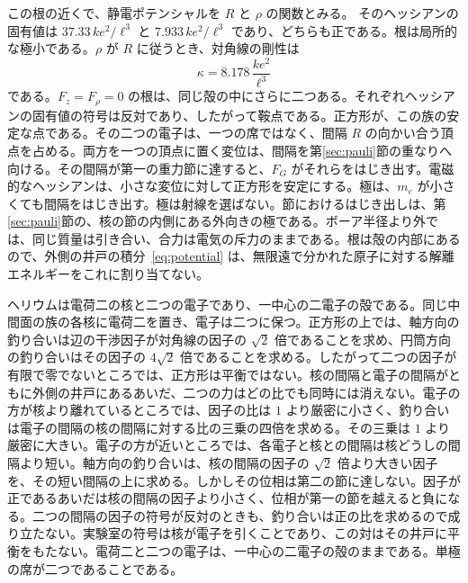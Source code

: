 \documentclass[a4paper]{article}
\begin{document}
この根の近くで、静電ポテンシャルを \(R\) と \(\rho\) の関数とみる。
そのヘッシアンの固有値は \(37.33\,k e^{2}/\ell^{3}\) と \(7.933\,k e^{2}/\ell^{3}\) であり、どちらも正である。根は局所的な極小である。\(\rho\) が \(R\) に従うとき、対角線の剛性は
\begin{equation}
\label{eq:kappa}
\kappa=8.178\,\frac{k e^{2}}{\ell^{3}}
\end{equation}
である。\(F_z=F_{\rho}=0\) の根は、同じ殻の中にさらに二つある。それぞれヘッシアンの固有値の符号は反対であり、したがって鞍点である。正方形が、この族の安定な点である。その二つの電子は、一つの席ではなく、間隔 \(R\) の向かい合う頂点を占める。両方を一つの頂点に置く変位は、間隔を第\ref{sec:pauli}節の重なりへ向ける。その間隔が第一の重力節に達すると、\(F_G\) がそれらをはじき出す。電磁的なヘッシアンは、小さな変位に対して正方形を安定にする。極は、\(m_e\) が小さくても間隔をはじき出す。極は射線を選ばない。節におけるはじき出しは、第\ref{sec:pauli}節の、核の節の内側にある外向きの極である。ボーア半径より外では、同じ質量は引き合い、合力は電気の斥力のままである。根は殻の内部にあるので、外側の井戸の積分~\eqref{eq:potential} は、無限遠で分かれた原子に対する解離エネルギーをこれに割り当てない。

ヘリウムは電荷二の核と二つの電子であり、一中心の二電子の殻である。同じ中間面の族の各核に電荷二を置き、電子は二つに保つ。正方形の上では、軸方向の釣り合いは辺の干渉因子が対角線の因子の \(\sqrt{2}\) 倍であることを求め、円筒方向の釣り合いはその因子の \(4\sqrt{2}\) 倍であることを求める。したがって二つの因子が有限で零でないところでは、正方形は平衡ではない。核の間隔と電子の間隔がともに外側の井戸にあるあいだ、二つの力はどの比でも同時には消えない。電子の方が核より離れているところでは、因子の比は \(1\) より厳密に小さく、釣り合いは電子の間隔の核の間隔に対する比の三乗の四倍を求める。その三乗は \(1\) より厳密に大きい。電子の方が近いところでは、各電子と核との間隔は核どうしの間隔より短い。軸方向の釣り合いは、核の間隔の因子の \(\sqrt{2}\) 倍より大きい因子を、その短い間隔の上に求める。しかしその位相は第二の節に達しない。因子が正であるあいだは核の間隔の因子より小さく、位相が第一の節を越えると負になる。二つの間隔の因子の符号が反対のときも、釣り合いは正の比を求めるので成り立たない。実験室の符号は核が電子を引くことであり、この対はその井戸に平衡をもたない。電荷二と二つの電子は、一中心の二電子の殻のままである。単極の席が二つであることである。
\end{document}
